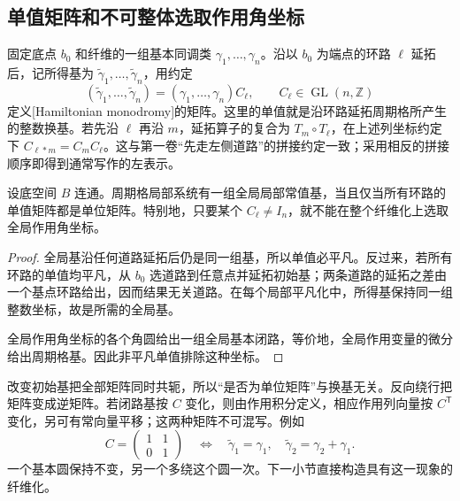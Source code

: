 \subsection{单值矩阵和不可整体选取作用角坐标}
\label{g4:subsec:1103:03}
固定底点 \(b_0\) 和纤维的一组基本同调类 \(\gamma_1,\ldots,\gamma_n\)。沿以 \(b_0\) 为端点的环路 \(\ell\) 延拓后，记所得基为 \(\widetilde\gamma_1,\ldots,\widetilde\gamma_n\)，用约定
\begin{equation}\label{g4:eq:1103:monodromy-matrix}
	(\widetilde\gamma_1,\ldots,\widetilde\gamma_n)
	=(\gamma_1,\ldots,\gamma_n)C_\ell,
	\qquad C_\ell\in\operatorname{GL}(n,\mathbb Z)
\end{equation}
定义[Hamiltonian monodromy]的矩阵。这里的单值就是沿环路延拓周期格所产生的整数换基。若先沿 \(\ell\) 再沿 \(m\)，延拓算子的复合为 \(T_m\circ T_\ell\)，在上述列坐标约定下 \(C_{\ell*m}=C_mC_\ell\)。这与第一卷“先走左侧道路”的拼接约定一致；采用相反的拼接顺序即得到通常写作的左表示。

\begin{proposition}\label{g4:prop:1103:monodromy-obstruction}
	设底空间 \(B\) 连通。周期格局部系统有一组全局局部常值基，当且仅当所有环路的单值矩阵都是单位矩阵。特别地，只要某个 \(C_\ell\ne I_n\)，就不能在整个纤维化上选取全局作用角坐标。
\end{proposition}
\begin{proof}
	全局基沿任何道路延拓后仍是同一组基，所以单值必平凡。反过来，若所有环路的单值均平凡，从 \(b_0\) 选道路到任意点并延拓初始基；两条道路的延拓之差由一个基点环路给出，因而结果无关道路。在每个局部平凡化中，所得基保持同一组整数坐标，故是所需的全局基。

	全局作用角坐标的各个角圆给出一组全局基本闭路，等价地，全局作用变量的微分给出周期格基。因此非平凡单值排除这种坐标。
\end{proof}

改变初始基把全部矩阵同时共轭，所以“是否为单位矩阵”与换基无关。反向绕行把矩阵变成逆矩阵。若闭路基按 \(C\) 变化，则由作用积分定义，相应作用列向量按 \(C^{\mathsf T}\) 变化，另可有常向量平移；这两种矩阵不可混写。例如
\[
	C=\begin{pmatrix}1&1\\0&1\end{pmatrix}
	\quad\Longleftrightarrow\quad
	\widetilde\gamma_1=\gamma_1,\quad
	\widetilde\gamma_2=\gamma_2+\gamma_1.
\]
一个基本圆保持不变，另一个多绕这个圆一次。下一小节直接构造具有这一现象的纤维化。


